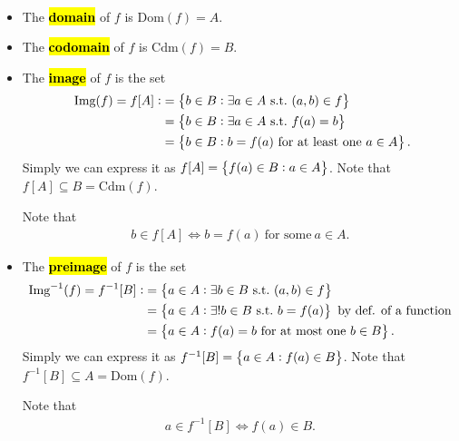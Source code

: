 \documentclass[11pt,openany]{article}
\begin{document}

\newpage
{}
\begin{remark*}
	\ \begin{itemize}
		\item The \hl{\textbf{domain}} of $f$ is $\text{Dom}(f)=A$.
		\item The \hl{\textbf{codomain}} of $f$ is $\text{Cdm}(f)=B$.
		\item The \hl{\textbf{image}} of $f$ is the set \begin{align*}\
			\img{f}=f[A]:&=\set{b\in B:\exists a \in A\ \text{s.t.}\ (a,b)\in f}\\
			&=\set{b\in B:\exists a \in A\ \text{s.t.}\ f(a)=b}\\
			&=\set{b\in B: b = f(a)\ \text{for at least one}\ a\in A}.
		\end{align*} Simply we can express it as $f[A]=\set{f(a)\in B:a\in A}$. Note that $f[A]\subseteq B=\text{Cdm}(f)$. 
	
		Note that \begin{align*}
			b\in f[A]\iff b=f(a)\ \text{for some}\ a\in A.
		\end{align*}
		\item The \hl{\textbf{preimage}} of $f$ is the set \begin{align*}
			\preimg{f}=f^{-1}[B]:&=\set{a\in A:\exists b \in B\ \text{s.t.}\ (a,b)\in f}\\
			&=\set{a\in A:\exists! b \in B\ \text{s.t.}\ b=f(a)}\ \text{by def. of a function}\\
			&=\set{a\in A:f(a)=b\ \text{for at most one}\ b\in B}.
		\end{align*} Simply we can express it as $f^{-1}[B]=\set{a\in A:f(a)\in B}$. Note that $f^{-1}[B]\subseteq A=\text{Dom}(f)$.
	
		Note that \begin{align*}
		a\in f^{-1}[B]\iff f(a)\in B.
\end{align*}
	\end{itemize}
\end{remark*}
\end{document}
